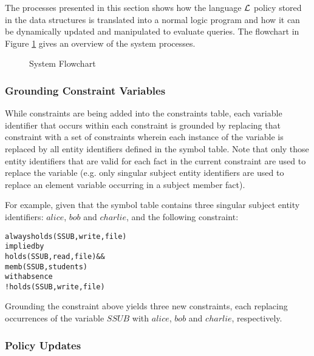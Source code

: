 \documentclass[11pt, twocolumn]{article}
\newenvironment{vverbose}
  {\begin{alltt}}
  {\vspace{-\baselineskip}\end{alltt}}
\begin{document}
      The processes presented in this section shows how the language
      ${\cal L}$ policy stored in the data structures is translated into a
      normal logic program and how it can be dynamically updated and
      manipulated to evaluate queries. The flowchart in Figure \ref{fig-2}
      gives an overview of the system processes.

      \begin{figure}[ht]
        \begin{center}
          \caption{System Flowchart}
          \label{fig-2}
        \end{center}
      \end{figure}

      \subsubsection{Grounding Constraint Variables}

        While constraints are being added into the constraints table, each
        variable identifier that occurs within each constraint is grounded by
        replacing that constraint with a set of constraints wherein each
        instance of the variable is replaced by all entity identifiers defined
        in the symbol table. Note that only those entity identifiers that are
        valid for each fact in the current constraint are used to replace the
        variable (e.g. only singular subject entity identifiers are used to
        replace an element variable occurring in a subject member fact).

        For example, given that the symbol table contains three singular
        subject entity identifiers: $alice$, $bob$ and $charlie$, and the
        following constraint:

        \begin{vverbose}
always holds(SSUB, write, file)
  implied by
    holds(SSUB, read, file) &&
    memb(SSUB, students)
  with absence
    !holds(SSUB, write, file)
        \end{vverbose}

        Grounding the constraint above yields three new constraints, each
        replacing occurrences of the variable $SSUB$ with $alice$, $bob$ and
        $charlie$, respectively.

      \subsubsection{Policy Updates}
\end{document}
